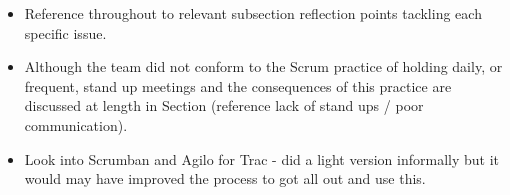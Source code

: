 \documentclass{l3proj}
\begin{document}
\begin{itemize}
\item Reference throughout to relevant subsection reflection points tackling each specific issue.
\item Although the team did not conform to the Scrum practice of holding daily, or frequent, stand up meetings and the consequences of this practice are discussed at length in Section (reference lack of stand ups / poor communication).
\item Look into Scrumban and Agilo for Trac - did a light version informally but it would may have improved the process to got all out and use this.
\end{itemize}



\end{document}
